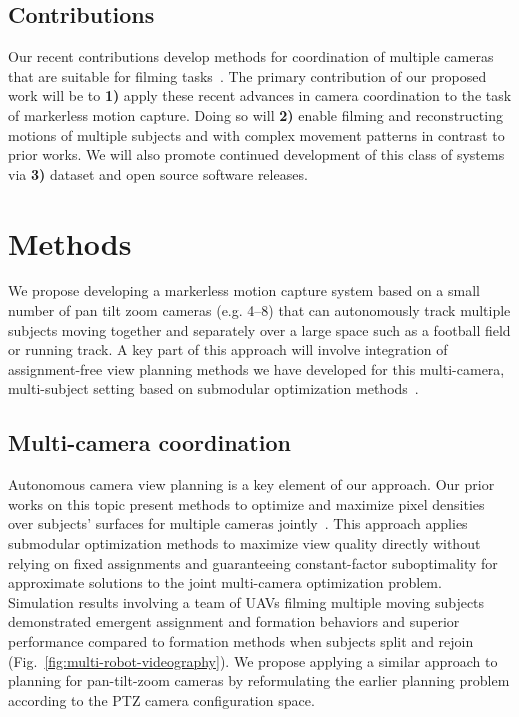 \documentclass[11pt]{article}
\begin{document}
\subsection{Contributions}

Our recent contributions develop methods for coordination of multiple cameras
that are suitable for filming tasks~\citep{hughes2024cdc,suresh2024iros}.
The primary contribution of our proposed work will be to
\textbf{1)} apply these recent
advances in camera coordination to the task of markerless motion capture.
Doing so will
\textbf{2)} enable filming and reconstructing motions of multiple subjects
and with complex movement patterns in contrast to prior works.
We will also promote continued development of this class of systems via
\textbf{3)} dataset and open source software releases.


\section{Methods}

We propose developing a markerless motion capture system based on a small number
of pan tilt zoom cameras (e.g. 4--8) that can autonomously track multiple
subjects moving together and separately over a large space such as a football
field or running track.
A key part of this approach will involve integration of assignment-free view
planning methods we have developed for this multi-camera, multi-subject setting
based on submodular optimization methods~\citep{suresh2024iros,hughes2024cdc}.

\subsection{Multi-camera coordination}

Autonomous camera view planning is a key element of our approach.
Our prior works on this topic present methods to optimize and maximize pixel
densities over subjects' surfaces for multiple cameras
jointly~\citep{suresh2024iros,hughes2024cdc}.
This approach applies submodular optimization methods to maximize view quality
directly without relying on fixed assignments and guaranteeing constant-factor
suboptimality for approximate solutions to the joint multi-camera optimization
problem.
Simulation results involving a team of UAVs filming multiple moving subjects
demonstrated emergent assignment and formation behaviors and superior
performance compared to formation methods when subjects split and rejoin
(Fig.~\ref{fig:multi-robot-videography}).
We propose applying a similar approach to planning for pan-tilt-zoom cameras by
reformulating the earlier planning problem according to the PTZ camera configuration
space.
\end{document}
